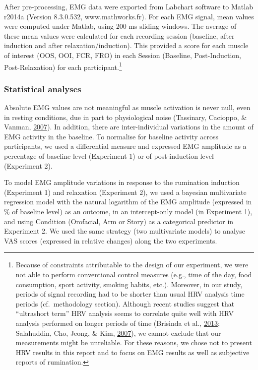 \documentclass[a4paper,12pt,twoside,onecolumn,openright,final,oldfontcommands]{memoir}
\let\rmarkdownfootnote\footnote%
\def\footnote{\protect\rmarkdownfootnote}
\begin{document}
After pre-processing, EMG data were exported from Labchart software to Matlab r2014a (Version 8.3.0.532, www.mathworks.fr). For each EMG signal, mean values were computed under Matlab, using 200 ms sliding windows. The average of these mean values were calculated for each recording session (baseline, after induction and after relaxation/induction). This provided a score for each muscle of interest (OOS, OOI, FCR, FRO) in each Session (Baseline, Post-Induction, Post-Relaxation) for each participant.\footnote{Because of constraints attributable to the design of our experiment, we were not able to perform conventional control measures (e.g., time of the day, food consumption, sport activity, smoking habits, etc.). Moreover, in our study, periods of signal recording had to be shorter than usual HRV analysis time periods (cf.~methodology section). Although recent studies suggest that \enquote{ultrashort term} HRV analysis seems to correlate quite well with HRV analysis performed on longer periods of time (Brisinda et al., \protect\hyperlink{ref-brisinda_comparison_2013}{2013}; Salahuddin, Cho, Jeong, \& Kim, \protect\hyperlink{ref-Salahuddin2007}{2007}), we cannot exclude that our measurements might be unreliable. For these reasons, we chose not to present HRV results in this report and to focus on EMG results as well as subjective reports of rumination.}

\hypertarget{statistical-analyses}{%
\subsubsection{Statistical analyses}\label{statistical-analyses}}

Absolute EMG values are not meaningful as muscle activation is never null, even in resting conditions, due in part to physiological noise (Tassinary, Cacioppo, \& Vanman, \protect\hyperlink{ref-berntson_skeletomotor_2007}{2007}). In addition, there are inter-individual variations in the amount of EMG activity in the baseline. To normalise for baseline activity across participants, we used a differential measure and expressed EMG amplitude as a percentage of baseline level (Experiment 1) or of post-induction level (Experiment 2).

To model EMG amplitude variations in response to the rumination induction (Experiment 1) and relaxation (Experiment 2), we used a bayesian multivariate regression model with the natural logarithm of the EMG amplitude (expressed in \% of baseline level) as an outcome, in an intercept-only model (in Experiment 1), and using Condition (Orofacial, Arm or Story) as a categorical predictor in Experiment 2. We used the same strategy (two multivariate models) to analyse VAS scores (expressed in relative changes) along the two experiments.
\end{document}
